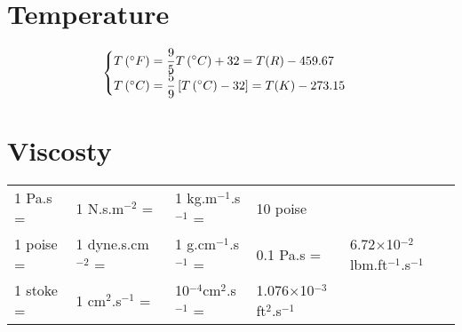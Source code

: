      \section{Temperature}\label{Chapter:UnitConversion:Section:Temperature}
     \begin{displaymath}
       \begin{cases}
         T\left(^{\circ}F\right) = \displaystyle\frac{9}{5}T\left(^{\circ}C\right) + 32 = T(R) - 459.67 & \\
         T\left(^{\circ}C\right) = \displaystyle\frac{5}{9}\left[T\left(^{\circ}C\right)-32\right] = T(K) - 273.15 & 
       \end{cases}      
     \end{displaymath}
     
     \section{Viscosty}\label{Chapter:UnitConversion:Section:Viscosity}
     \begin{center}
     \begin{tabular}{|l l l l l|}
       \hline
       1 Pa.s =& 1 N.s.m$^{-2}$ =& 1 kg.m$^{-1}$.s$^{-1}$ =& 10 poise &   \\
       1 poise =& 1 dyne.s.cm$^{-2}$ =& 1 g.cm$^{-1}$.s$^{-1}$ =& 0.1 Pa.s =& 6.72$\times$10$^{-2}$ lbm.ft$^{-1}$.s$^{-1}$\\
       1 stoke =& 1 cm$^{2}$.s$^{-1}$ =& 10$^{-4}$cm$^{2}$.s$^{-1}$ =& 1.076$\times$10$^{-3}$ ft$^{2}$.s$^{-1}$ & \\
       \hline           
     \end{tabular}
     \end{center}
     
